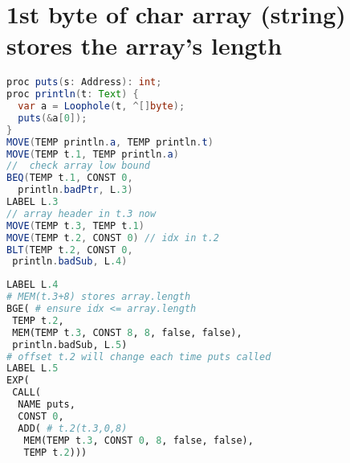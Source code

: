 \section*{1st byte of char array (string) stores the array's length}
\begin{minipage}{.45\linewidth}
\begin{lstlisting}[language=Java,frame=none,
morekeywords={proc,var,to,loop,Text,Ord,Address,Number,Loophole,}]
proc puts(s: Address): int;
proc println(t: Text) {
  var a = Loophole(t, ^[]byte);
  puts(&a[0]);
}
MOVE(TEMP println.a, TEMP println.t)
MOVE(TEMP t.1, TEMP println.a)
//  check array low bound
BEQ(TEMP t.1, CONST 0,
  println.badPtr, L.3)
LABEL L.3
// array header in t.3 now
MOVE(TEMP t.3, TEMP t.1)
MOVE(TEMP t.2, CONST 0) // idx in t.2
BLT(TEMP t.2, CONST 0,
 println.badSub, L.4)
\end{lstlisting}
\end{minipage}
\begin{minipage}{.6\linewidth}
\begin{lstlisting}[language=Python,frame=none,xleftmargin=-1em]
LABEL L.4
# MEM(t.3+8) stores array.length
BGE( # ensure idx <= array.length
 TEMP t.2,
 MEM(TEMP t.3, CONST 8, 8, false, false),
 println.badSub, L.5)
# offset t.2 will change each time puts called
LABEL L.5
EXP(
 CALL(
  NAME puts,
  CONST 0,
  ADD( # t.2(t.3,0,8)
   MEM(TEMP t.3, CONST 0, 8, false, false),
   TEMP t.2)))
\end{lstlisting}
\end{minipage}
